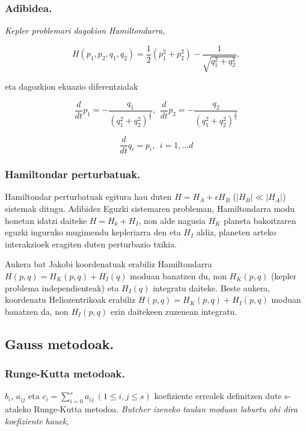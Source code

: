 \subsubsection*{Adibidea.}
\it {Kepler problemari} dagokion Hamiltondarra,

\begin{equation}
H(p_1,p_2,q_1,q_2)=\frac{1}{2}(p_1^2+p_2^2)-\frac{1}{\sqrt{q_1^2+q_2^2}},
\end{equation}

eta dagozkion ekuazio diferentzialak

\begin{equation}
\frac{d}{dt}{p}_1= -\frac{q_1}{(q_1^2+q_2^2)^{\frac{3}{2}}}, \ \, \frac{d}{dt}{p}_2= -\frac{q_2}{(q_1^2+q_2^2)^{\frac{3}{2}}}
\end{equation}
  
\begin{equation}
\frac{d}{dt}{q}_i=p_i, \ \ i=1, \dots d
\end{equation}



\subsubsection*{Hamiltondar perturbatuak.}

Hamiltondar perturbatuak egitura hau duten $H=H_A+\epsilon H_B$ ($|H_B|\ll |H_A|$)  sistemak ditugu. Adibidez Eguzki sistemaren probleman, Hamiltondarra modu honetan idatzi daiteke $H=H_k+H_I$, non alde nagusia $H_K$ planeta bakoitzaren eguzki inguruko mugimendu kepleriarra den eta $H_I$ aldiz, planeten arteko interakzioek eragiten duten perturbazio txikia.   

Aukera bat Jakobi koordenatuak erabiliz Hamiltondarra $H(p,q)=H_K(p,q)+H_I(q)$ moduan banatzen du, non $H_K(p,q)$ (kepler problema independienteak) eta $H_I(q)$ integratu daiteke. Beste aukera, koordenatu Heliozentrikoak erabiliz
$H(p,q)=H_K(p,q)+H_I(p,q)$ moduan banatzen da, non $H_I(p,q)$ ezin daitekeen zuzenean integratu.

\subsection{Gauss metodoak.}


\subsubsection{Runge-Kutta metodoak.}

$b_{i}$, $a_{ij}$ eta $c_i=\sum\limits_{i=0}^{s} a_{ij} \ (1 \leq i,j \leq s)$ koefiziente errealek definitzen dute s-ataleko Runge-Kutta metodoa. \it{Butcher} izeneko taulan moduan laburtu ohi dira koefiziente hauek, 

